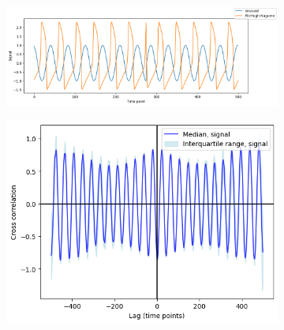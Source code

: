 \begin{figure}[hb!]
  \centering
  \begin{subfigure}[t]{0.6\textwidth}
  \centering
    \includegraphics[width=\linewidth]{sinusoid_and_fitzhughnagumo_nonoise.png}
    \caption{
    }
    \label{fig:xcf-nonoise-ts}
  \end{subfigure}%
  \centering
  \begin{subfigure}[t]{0.4\textwidth}
  \centering
    \includegraphics[width=\linewidth]{randomshift_sinusoid_fitzhughnagumo_xcf.png}
    \caption{
    }
    \label{fig:xcf-nonoise-xcf}
  \end{subfigure}


\end{figure}
